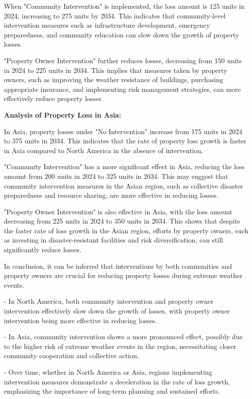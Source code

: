 \documentclass[12pt]{article}
\begin{document}
When "Community Intervention" is implemented, the loss amount is 125 units in 2024, increasing to 275 units by 2034. This indicates that community-level intervention measures such as infrastructure development, emergency preparedness, and community education can slow down the growth of property losses.

"Property Owner Intervention" further reduces losses, decreasing from 150 units in 2024 to 225 units in 2034. This implies that measures taken by property owners, such as improving the weather resistance of buildings, purchasing appropriate insurance, and implementing risk management strategies, can more effectively reduce property losses.

\textbf{Analysis of Property Loss in Asia:}

In Asia, property losses under "No Intervention" increase from 175 units in 2024 to 375 units in 2034. This indicates that the rate of property loss growth is faster in Asia compared to North America in the absence of intervention.

"Community Intervention" has a more significant effect in Asia, reducing the loss amount from 200 units in 2024 to 325 units in 2034. This may suggest that community intervention measures in the Asian region, such as collective disaster preparedness and resource sharing, are more effective in reducing losses.

"Property Owner Intervention" is also effective in Asia, with the loss amount decreasing from 225 units in 2024 to 350 units in 2034. This shows that despite the faster rate of loss growth in the Asian region, efforts by property owners, such as investing in disaster-resistant facilities and risk diversification, can still significantly reduce losses.

In conclusion, it can be inferred that interventions by both communities and property owners are crucial for reducing property losses during extreme weather events.

- In North America, both community intervention and property owner intervention effectively slow down the growth of losses, with property owner intervention being more effective in reducing losses.

- In Asia, community intervention shows a more pronounced effect, possibly due to the higher risk of extreme weather events in the region, necessitating closer community cooperation and collective action.

- Over time, whether in North America or Asia, regions implementing intervention measures demonstrate a deceleration in the rate of loss growth, emphasizing the importance of long-term planning and sustained efforts.
\end{document}
